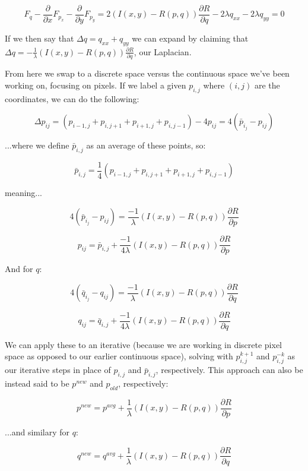 \documentclass{article}
\begin{document}
\begin{equation}
    F_q - \frac{\partial}{\partial x} F_{p_x} - \frac{\partial}{\partial y} F_{p_y} = 
    2(I(x,y)-R(p,q))\frac{\partial R}{\partial q} - 2 \lambda q_{xx} - 2\lambda q_{yy} = 0
\end{equation}

\noindent If we then say that $\Delta q = q_{xx} + q_{yy}$ we can expand by claiming that $\Delta q = - \frac{1}{\lambda}(I(x,y) - R(p,q)) \frac{\partial R}{\partial q}$, our Laplacian.

From here we swap to a discrete space versus the continuous space we've been working on, focusing on pixels. If we label a given $p_{i,j}$ where $(i,j)$ are the coordinates, we can do the following:

\begin{equation}
    \Delta p_{ij} = (p_{i-1,j} + p_{i,j+1} + p_{i+1,j} + p_{i, j-1}) - 4p_{ij} = 4(\bar{p}_{i_j} - p_{ij})
\end{equation}

\noindent ...where we define $\bar{p}_{i,j}$ as an average of these points, so:

\begin{equation}
    \bar{p}_{i,j} = \frac{1}{4}(p_{i-1,j} + p_{i,j+1} + p_{i+1,j} + p_{i, j-1})
\end{equation}

\noindent meaning...

\begin{equation}
    4(\bar{p}_{i_j} - p_{ij}) = \frac{-1}{\lambda}(I(x,y)-R(p,q))\frac{\partial R}{\partial p}
\end{equation}

\begin{equation}
    p_{ij} = \bar{p}_{i,j} + \frac{-1}{4 \lambda}(I(x,y)-R(p,q))\frac{\partial R}{\partial p}
\end{equation}

\noindent And for $q$:

\begin{equation}
    4(\bar{q}_{i_j} - q_{ij}) = \frac{-1}{\lambda}(I(x,y)-R(p,q))\frac{\partial R}{\partial q}
\end{equation}

\begin{equation}
    q_{ij} = \bar{q}_{i,j} + \frac{-1}{4 \lambda}(I(x,y)-R(p,q))\frac{\partial R}{\partial q}
\end{equation}

\noindent We can apply these to an iterative (because we are working in discrete pixel space as opposed to our earlier continuous space), solving with $p_{i,j}^{k+1}$ and $p_{i,j}^{-k}$ as our iterative steps in place of $p_{i,j}$ and $\bar{p}_{i,j}$, respectively. This approach can also be instead said to be $p^{new}$ and $p_{old}$, respectively:

\begin{equation}
    p^{new} = p^{avg} + \frac{1}{\lambda}(I(x,y)-R(p,q))\frac{\partial R}{\partial p}
\end{equation}

\noindent ...and similary for $q$:

\begin{equation}
    q^{new} = q^{avg} + \frac{1}{\lambda}(I(x,y)-R(p,q))\frac{\partial R}{\partial q}
\end{equation}
\end{document}
